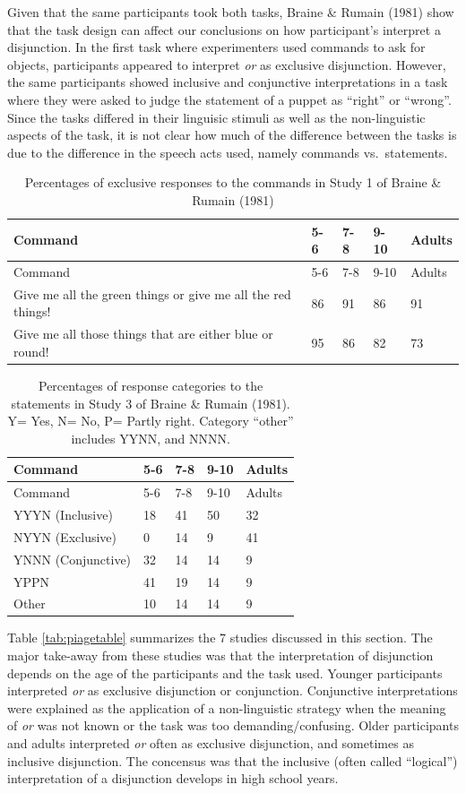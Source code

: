 \documentclass[oneside]{report}
\theoremstyle{definition}
\theoremstyle{definition}
\theoremstyle{definition}
\theoremstyle{remark}
\begin{document}
Given that the same participants took both tasks, Braine \& Rumain
(1981) show that the task design can affect our conclusions on how
participant's interpret a disjunction. In the first task where
experimenters used commands to ask for objects, participants appeared to
interpret \emph{or} as exclusive disjunction. However, the same
participants showed inclusive and conjunctive interpretations in a task
where they were asked to judge the statement of a puppet as ``right'' or
``wrong''. Since the tasks differed in their linguisic stimuli as well
as the non-linguistic aspects of the task, it is not clear how much of
the difference between the tasks is due to the difference in the speech
acts used, namely commands vs.~statements.
\begin{longtable}[]{@{}lllll@{}}
\caption{\label{tab:brainRumainTableOne} Percentages of exclusive responses
to the commands in Study 1 of Braine \& Rumain (1981)}\tabularnewline
\toprule
Command & 5-6 & 7-8 & 9-10 & Adults\tabularnewline
\midrule
\endfirsthead
\toprule
Command & 5-6 & 7-8 & 9-10 & Adults\tabularnewline
\midrule
\endhead
Give me all the green things or give me all the red things! & 86 & 91 &
86 & 91\tabularnewline
Give me all those things that are either blue or round! & 95 & 86 & 82 &
73\tabularnewline
\bottomrule
\end{longtable}
\begin{longtable}[]{@{}lllll@{}}
\caption{\label{tab:brainRumainTableTwo} Percentages of response categories
to the statements in Study 3 of Braine \& Rumain (1981). Y= Yes, N= No,
P= Partly right. Category ``other'' includes YYNN, and
NNNN.}\tabularnewline
\toprule
Command & 5-6 & 7-8 & 9-10 & Adults\tabularnewline
\midrule
\endfirsthead
\toprule
Command & 5-6 & 7-8 & 9-10 & Adults\tabularnewline
\midrule
\endhead
YYYN (Inclusive) & 18 & 41 & 50 & 32\tabularnewline
NYYN (Exclusive) & 0 & 14 & 9 & 41\tabularnewline
YNNN (Conjunctive) & 32 & 14 & 14 & 9\tabularnewline
YPPN & 41 & 19 & 14 & 9\tabularnewline
Other & 10 & 14 & 14 & 9\tabularnewline
\bottomrule
\end{longtable}
Table \ref{tab:piagetable} summarizes the 7 studies discussed in this
section. The major take-away from these studies was that the
interpretation of disjunction depends on the age of the participants and
the task used. Younger participants interpreted \emph{or} as exclusive
disjunction or conjunction. Conjunctive interpretations were explained
as the application of a non-linguistic strategy when the meaning of
\emph{or} was not known or the task was too demanding/confusing. Older
participants and adults interpreted \emph{or} often as exclusive
disjunction, and sometimes as inclusive disjunction. The concensus was
that the inclusive (often called ``logical'') interpretation of a
disjunction develops in high school years.
\end{document}
